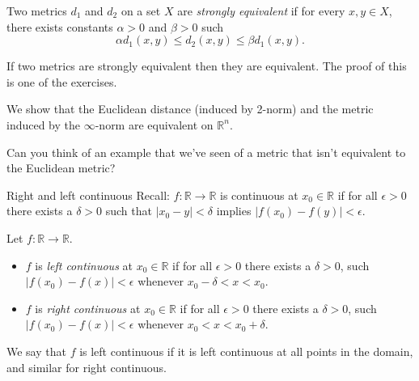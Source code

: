 \documentclass [aspectratio=169]{beamer}
\newcommand{\R}{{\mathbb{R}}}
\begin{document}
\begin{frame}

\begin{definition}
Two metrics $d_1$ and $d_2$ on a set $X$ are \emph{strongly equivalent} if for every $x,y\in X$, there exists constants $\alpha>0$ and $\beta>0$ such
\begin{equation*}
    \alpha d_1(x,y) \leq d_2(x,y) \leq \beta d_1(x,y).
\end{equation*}
\end{definition}

If two metrics are strongly equivalent then they are equivalent. The proof of this is one of the exercises. 
\end{frame}

\begin{frame}
\begin{example}
We show that the Euclidean distance (induced by 2-norm) and the metric induced by the $\infty$-norm are equivalent on $\R^n$. 
\vspace{5cm}
\end{example}
Can you think of an example that we've seen of a metric that isn't equivalent to the Euclidean metric?
\end{frame}


\begin{frame}{Right and left continuous}
Recall: $f\colon \R \to \R$ is continuous at $x_0\in \R$ if for all $\epsilon>0$ there exists a $\delta>0$ such that $\vert x_0-y\vert <\delta$ implies $\vert f(x_0)-f(y)\vert<\epsilon$.

\vspace{1em}

\begin{definition} Let $f\colon \R \to \R$.
\begin{itemize}
    \item $f$ is \emph{left continuous} at $x_0\in \R$ if for all $\epsilon >0$ there exists a $\delta>0$, such $\vert f(x_0)-f(x)\vert<\epsilon$ whenever $ x_0-\delta <x<x_0$.
    \item $f$ is \emph{right continuous} at $x_0\in \R$ if for all $\epsilon >0$ there exists a $\delta>0$, such $\vert f(x_0)-f(x)\vert<\epsilon$ whenever $x_0<x<x_0+\delta$.
\end{itemize}
We say that $f$ is left continuous if it is left continuous at all points in the domain, and similar for right continuous.
\end{definition}




\end{frame}
\end{document}
